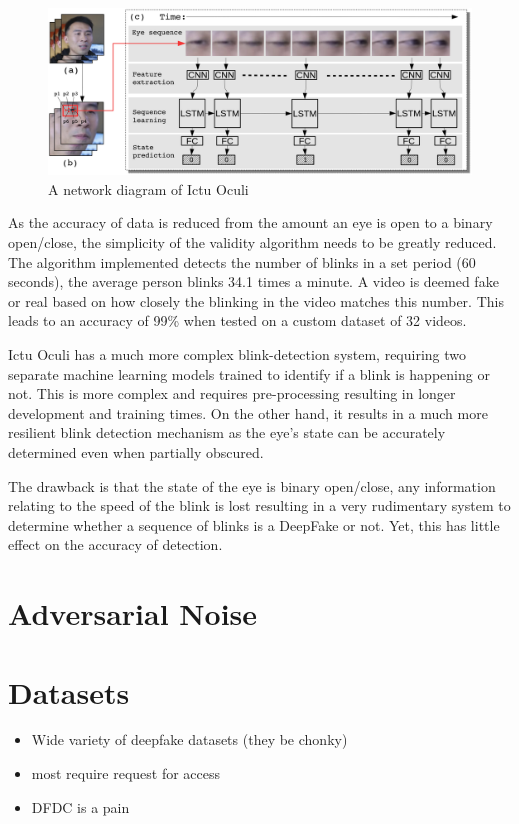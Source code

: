 \begin{figure}[H]
    \centering
    \includegraphics[width=0.75\linewidth]{dissertation//figures/ictu-oculi.png}
    \caption{A network diagram of Ictu Oculi\cite{li2018ictu}}
    \label{fig:ictu-oculi}
\end{figure}

As the accuracy of data is reduced from the amount an eye is open to a binary open/close, the simplicity of the validity algorithm needs to be greatly reduced. The algorithm implemented detects the number of blinks in a set period (60 seconds), the average person blinks 34.1 times a minute. A video is deemed fake or real based on how closely the blinking in the video matches this number. This leads to an accuracy of 99\% when tested on a custom dataset of 32 videos.

Ictu Oculi has a much more complex blink-detection system, requiring two separate machine learning models trained to identify if a blink is happening or not. This is more complex and requires pre-processing resulting in longer development and training times. On the other hand, it results in a much more resilient blink detection mechanism as the eye's state can be accurately determined even when partially obscured.

The drawback is that the state of the eye is binary open/close, any information relating to the speed of the blink is lost resulting in a very rudimentary system to determine whether a sequence of blinks is a DeepFake or not. Yet, this has little effect on the accuracy of detection.

\section{Adversarial Noise}


\section{Datasets}
\label{sec:datasets}

\begin{itemize}
    \item Wide variety of deepfake datasets (they be chonky)
    \item most require request for access
    \item DFDC is a pain
\end{itemize}